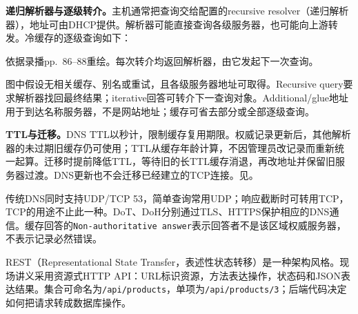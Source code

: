 \textbf{递归解析器与逐级转介。}主机通常把查询交给配置的recursive resolver（递归解析器），地址可由DHCP提供。解析器可能直接查询各级服务器，也可能向上游转发。冷缓存的逐级查询如下：
\begin{center}
\begin{minipage}{\linewidth}
\centering
{}

\small 依据录播pp.~86--88重绘。每次转介均返回解析器，由它发起下一次查询。
\end{minipage}
\end{center}
图中假设无相关缓存、别名或重试，且各级服务器地址可取得。Recursive query要求解析器找回最终结果；iterative回答可转介下一查询对象。Additional/glue地址用于到达名称服务器，不是网站地址；缓存可省去部分或全部逐级查询。

\textbf{TTL与迁移。}DNS TTL以秒计，限制缓存复用期限。权威记录更新后，其他解析器的未过期旧缓存仍可使用；TTL从缓存年龄计算，不因管理员改记录而重新统一起算。迁移时提前降低TTL，等待旧的长TTL缓存消退，再改地址并保留旧服务器过渡。DNS更新也不会迁移已经建立的TCP连接。见。

传统DNS同时支持UDP/TCP 53，简单查询常用UDP；响应截断时可转用TCP，TCP的用途不止此一种。DoT、DoH分别通过TLS、HTTPS保护相应的DNS通信。缓存回答的\texttt{Non-authoritative answer}表示回答者不是该区域权威服务器，不表示记录必然错误。


REST（Representational State Transfer，表述性状态转移）是一种架构风格。现场讲义采用资源式HTTP API：URL标识资源，方法表达操作，状态码和JSON表达结果。集合可命名为\texttt{/api/products}，单项为\texttt{/api/products/3}；后端代码决定如何把请求转成数据库操作。

